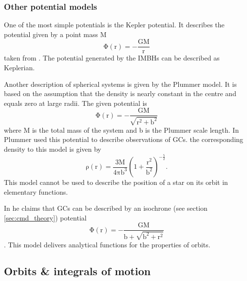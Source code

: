 \subsubsection{Other potential models}\label{sec:other_pot}
One of the most simple potentials is the Kepler potential. It describes the potential given by a point mass M
\begin{equation}\label{eq:kep_pot}
\mathrm{\Phi(r)=-\frac{GM}{r}}
\end{equation}  taken from \citet[eq. 2.34]{2008gady.book.....B}. The potential generated by the \acp{IMBH} can be described  as Keplerian. 
\par Another description of spherical systems is given by the Plummer model. It is based on the assumption that the density is nearly constant in the centre and equals zero at large radii. The given potential is 
\begin{equation}\label{eq:Plum_pot}
\mathrm{\Phi(r)=-\frac{GM}{\sqrt{r^2+b^2}}}
\end{equation}
\citep[eq. 2.44a]{2008gady.book.....B} where M is the total mass of the system and b is the Plummer scale length. In \citet{1911MNRAS..71..460P} Plummer used this potential to describe observations of \acp{GC}. the corresponding density to this model is given by \citet[eq. 2.44b]{2008gady.book.....B}
\begin{equation}\label{eq:Plumm_dens}
\mathrm{\rho(r)=\frac{3M}{4\pi b^3}\left(1+\frac{r^2}{b^2}\right)^{-\frac{5}{2}}.}
\end{equation}
This model cannot be used to describe the position of a star on its orbit in elementary functions. 
\par In \citet{2014arXiv1411.4937B} he claims that \acp{GC} can be described by an isochrone (see section \ref{sec:cmd_theory}) potential 
\begin{equation}\label{eq:isochr_pot}
\mathrm{\Phi(r)=-\frac{GM}{b+\sqrt{b^2+r^2}}}
\end{equation} 
\citep[eq. 2.47]{2008gady.book.....B}. This model delivers analytical functions for the properties of orbits.
\subsection{Orbits \& integrals of motion}\label{sec:orbit_int_of_motion_theory}
